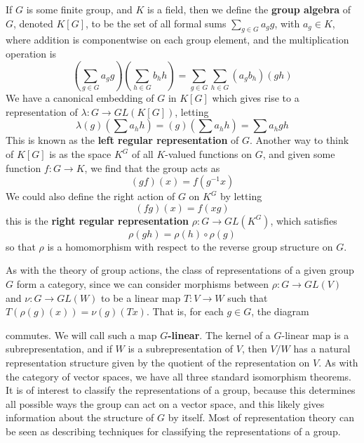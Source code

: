 \begin{example}
    If $G$ is some finite group, and $K$ is a field, then we define the {\bf group algebra} of $G$, denoted $K[G]$, to be the set of all formal sums $\sum_{g \in G} a_g g$, with $a_g \in K$, where addition is componentwise on each group element, and the multiplication operation is
    \[ \left( \sum_{g \in G} a_g g \right) \left( \sum_{h \in G} b_h h \right) = \sum_{g \in G} \sum_{h \in G} (a_g b_h) (gh) \]
    We have a canonical embedding of $G$ in $K[G]$ which gives rise to a representation of $\lambda: G \to GL(K[G])$, letting
    \[ \lambda(g) \left( \sum a_h h \right) = (g) \left( \sum a_h h \right) = \sum a_h gh \]
    This is known as the {\bf left regular representation} of $G$. Another way to think of $K[G]$ is as the space $K^G$ of all $K$-valued functions on $G$, and given some function $f: G \to K$, we find that the group acts as
    \[ (gf)(x) = f(g^{-1}x) \]
    We could also define the right action of $G$ on $K^G$ by letting
    \[ (fg)(x) = f(xg) \]
    this is the {\bf right regular representation} $\rho: G \to GL(K^G)$, which satisfies
    \[ \rho(gh) = \rho(h) \circ \rho(g) \]
    so that $\rho$ is a homomorphism with respect to the reverse group structure on $G$.
\end{example}

As with the theory of group actions, the class of representations of a given group $G$ form a category, since we can consider morphisms between $\rho: G \to GL(V)$ and $\nu: G \to GL(W)$ to be a linear map $T: V \to W$ such that $T(\rho(g)(x)) = \nu(g)(Tx)$. That is, for each $g \in G$, the diagram
%
\begin{center}
\end{center}
%
commutes. We will call such a map {\bf $G$-linear}. The kernel of a $G$-linear map is a subrepresentation, and if $W$ is a subrepresentation of $V$, then $V/W$ has a natural representation structure given by the quotient of the representation on $V$. As with the category of vector spaces, we have all three standard isomorphism theorems. It is of interest to classify the representations of a group, because this determines all possible ways the group can act on a vector space, and this likely gives information about the structure of $G$ by itself. Most of representation theory can be seen as describing techniques for classifying the representations of a group.

